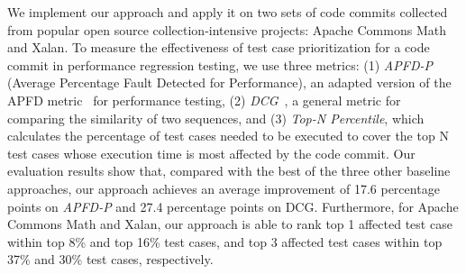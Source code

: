



We implement our approach and apply it on two sets of code commits collected from popular open source collection-intensive projects: Apache Commons Math and Xalan. To measure the effectiveness of test case prioritization for a code commit in performance regression testing, we use three metrics: (1) \textit{APFD-P} (Average Percentage Fault Detected for Performance), an adapted version of the APFD metric~\cite{AlexeyAPFD} for performance testing, (2) \textit{DCG}~\cite{NDCG}, a general metric for comparing the similarity of two sequences, and (3) \textit{Top-N Percentile}, which calculates the percentage of test cases needed to be executed to cover the top N test cases whose execution time is most affected by the code commit. Our evaluation results show that, compared with the best of the three other baseline approaches, our approach achieves an average improvement of 17.6 percentage points on \textit{APFD-P} and 27.4 percentage points on DCG. Furthermore, for Apache Commons Math and Xalan, our approach is able to rank top 1 affected test case within top 8\% and top 16\% test cases, and top 3 affected test cases within top 37\% and 30\% test cases, respectively. 




